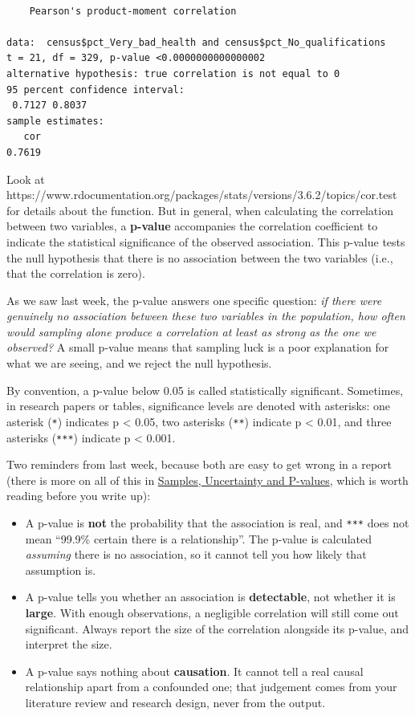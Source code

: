 \documentclass[
  letterpaper,
  DIV=11,
  numbers=noendperiod]{scrreprt}
\providecommand{\tightlist}{%
  \setlength{\itemsep}{0pt}\setlength{\parskip}{0pt}}
\begin{document}
\begin{verbatim}

    Pearson's product-moment correlation

data:  census$pct_Very_bad_health and census$pct_No_qualifications
t = 21, df = 329, p-value <0.0000000000000002
alternative hypothesis: true correlation is not equal to 0
95 percent confidence interval:
 0.7127 0.8037
sample estimates:
   cor 
0.7619 
\end{verbatim}

Look at
https://www.rdocumentation.org/packages/stats/versions/3.6.2/topics/cor.test
for details about the function. But in general, when calculating the
correlation between two variables, a \textbf{p-value} accompanies the
correlation coefficient to indicate the statistical significance of the
observed association. This p-value tests the null hypothesis that there
is no association between the two variables (i.e., that the correlation
is zero).

As we saw last week, the p-value answers one specific question: \emph{if
there were genuinely no association between these two variables in the
population, how often would sampling alone produce a correlation at
least as strong as the one we observed?} A small p-value means that
sampling luck is a poor explanation for what we are seeing, and we
reject the null hypothesis.

By convention, a p-value below 0.05 is called statistically significant.
Sometimes, in research papers or tables, significance levels are denoted
with asterisks: one asterisk (\texttt{*}) indicates p \textless{} 0.05,
two asterisks (\texttt{**}) indicate p \textless{} 0.01, and three
asterisks (\texttt{***}) indicate p \textless{} 0.001.

Two reminders from last week, because both are easy to get wrong in a
report (there is more on all of this in
\href{https://gdsl-ul.github.io/stats/general/inference.html}{Samples,
Uncertainty and P-values}, which is worth reading before you write up):

\begin{itemize}
\tightlist
\item
  A p-value is \textbf{not} the probability that the association is
  real, and \texttt{***} does not mean ``99.9\% certain there is a
  relationship''. The p-value is calculated \emph{assuming} there is no
  association, so it cannot tell you how likely that assumption is.
\item
  A p-value tells you whether an association is \textbf{detectable}, not
  whether it is \textbf{large}. With enough observations, a negligible
  correlation will still come out significant. Always report the size of
  the correlation alongside its p-value, and interpret the size.
\item
  A p-value says nothing about \textbf{causation}. It cannot tell a real
  causal relationship apart from a confounded one; that judgement comes
  from your literature review and research design, never from the
  output.
\end{itemize}
\end{document}
